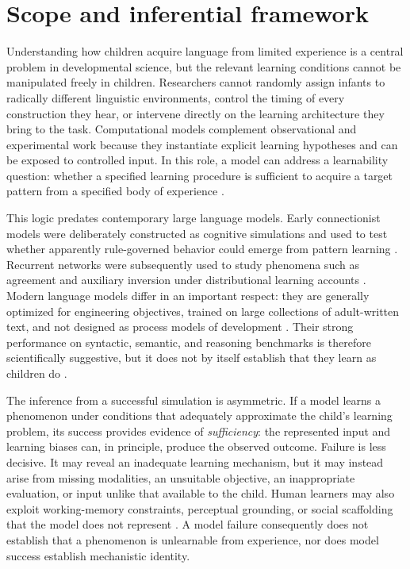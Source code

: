 \section{Scope and inferential framework}
\label{sec:litreview:framework}

Understanding how children acquire language from limited experience is a central problem in developmental science, but the relevant learning conditions cannot be manipulated freely in children. Researchers cannot randomly assign infants to radically different linguistic environments, control the timing of every construction they hear, or intervene directly on the learning architecture they bring to the task. Computational models complement observational and experimental work because they instantiate explicit learning hypotheses and can be exposed to controlled input. In this role, a model can address a learnability question: whether a specified learning procedure is sufficient to acquire a target pattern from a specified body of experience \citep{chater2006probabilistic,Perfors2011,dupoux2018cognitive}.

This logic predates contemporary large language models. Early connectionist models were deliberately constructed as cognitive simulations and used to test whether apparently rule-governed behavior could emerge from pattern learning \citep{rumelhart_learning_1986,Elman1990}. Recurrent networks were subsequently used to study phenomena such as agreement and auxiliary inversion under distributional learning accounts \citep{Elman1991,Lewis2001,Reali2004}. Modern language models differ in an important respect: they are generally optimized for engineering objectives, trained on large collections of adult-written text, and not designed as process models of development \citep{brown2020language,warstadt2022what}. Their strong performance on syntactic, semantic, and reasoning benchmarks is therefore scientifically suggestive, but it does not by itself establish that they learn as children do \citep{Linzen2021,Mahowald2024}.

The inference from a successful simulation is asymmetric. If a model learns a phenomenon under conditions that adequately approximate the child's learning problem, its success provides evidence of \emph{sufficiency}: the represented input and learning biases can, in principle, produce the observed outcome. Failure is less decisive. It may reveal an inadequate learning mechanism, but it may instead arise from missing modalities, an unsuitable objective, an inappropriate evaluation, or input unlike that available to the child. Human learners may also exploit working-memory constraints, perceptual grounding, or social scaffolding that the model does not represent \citep{tomasello2003constructing,warstadt2022what}. A model failure consequently does not establish that a phenomenon is unlearnable from experience, nor does model success establish mechanistic identity.

